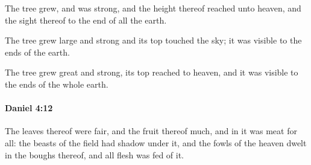 			\begin{versebox}
					\item[BHS] 
					\item[LXX] 
					\item[ASV] The tree grew, and was strong, and the height thereof reached unto heaven, and the sight thereof to the end of all the earth.
					\item[NIV] The tree grew large and strong and its top touched the sky; it was visible to the ends of the earth.
					\item[NRSV] The tree grew great and strong, its top reached to heaven, and it was visible to the ends of the whole earth.
			\end{versebox}

		\paragraph{Daniel 4:12} %
			\label{DANIEL-4-12}

			The leaves thereof were fair, and the fruit thereof much, and in it was meat for all: the beasts of the field had shadow under it, and the fowls of the heaven dwelt in the boughs thereof, and all flesh was fed of it.


